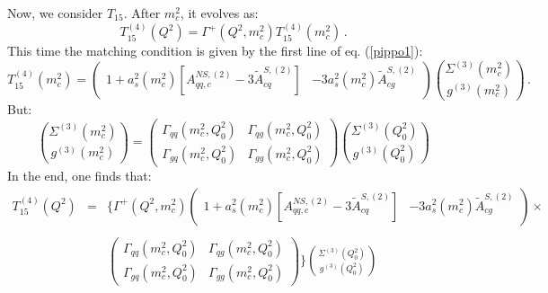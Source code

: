 \documentclass[10pt,a4paper]{article}
\begin{document}
Now, we consider $T_{15}$. After $m_c^2$, it evolves as:
\begin{equation}
T_{15}^{(4)}(Q^2)=\Gamma^{+}(Q^2,m_c^2)T^{(4)}_{15}(m_c^2)\,.
\end{equation}
This time the matching condition is given by the first line of eq. (\ref{pippo1}):
\begin{equation}
T_{15}^{(4)}(m_c^2)= \begin{pmatrix}  1+a_s^2(m_c^2)[A_{qq,c}^{N\!S,(2)}-3\tilde{A}^{S,(2)}_{cq}] & -3a_s^2(m_c^2)\tilde{A}^{S,(2)}_{cg} \end{pmatrix}{\Sigma^{(3)}(m_c^2) \choose g^{(3)}(m_c^2)}\,.
\end{equation}
But:
\begin{equation}
{\Sigma^{(3)}(m_c^2) \choose g^{(3)}(m_c^2) }=\begin{pmatrix} \Gamma_{qq}(m_c^2,Q_0^2) & \Gamma_{qg}(m_c^2,Q_0^2)\\ \Gamma_{gq}(m_c^2,Q_0^2) & \Gamma_{gg}(m_c^2,Q_0^2)\end{pmatrix}{\Sigma^{(3)}(Q_0^2) \choose g^{(3)}(Q_0^2)}
\end{equation}
In the end, one finds that:
\begin{equation}
\begin{array}{rcl}
\displaystyle T_{15}^{(4)}(Q^2)&=&\Bigg\{\Gamma^{+}(Q^2,m_c^2)\begin{pmatrix} 1+a_s^2(m_c^2)[A_{qq,c}^{N\!S,(2)}-3\tilde{A}^{S,(2)}_{cq}] & -3a_s^2(m_c^2)\tilde{A}^{S,(2)}_{cg}\end{pmatrix}\times\\
\\
& &\displaystyle \begin{pmatrix}\Gamma_{qq}(m_c^2,Q_0^2) & \Gamma_{qg}(m_c^2,Q_0^2)\\ \Gamma_{gq}(m_c^2,Q_0^2) & \Gamma_{gg}(m_c^2,Q_0^2)\end{pmatrix}\Bigg\}{\Sigma^{(3)}(Q_0^2) \choose g^{(3)}(Q_0^2)}
\end{array}
\end{equation} 
\end{document}
